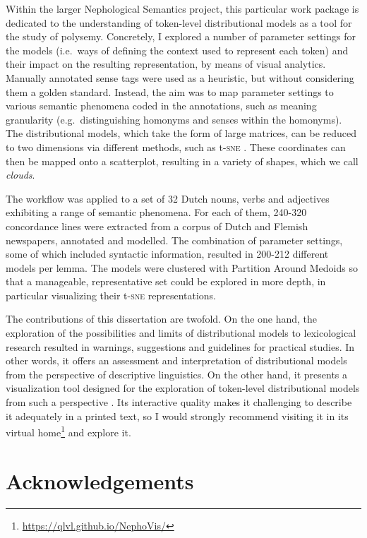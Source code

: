 \documentclass[
]{book}
\begin{document}
Within the larger Nephological Semantics project, this particular work package is dedicated
to the understanding of token-level distributional models as a tool
for the study of polysemy. Concretely, I explored a number of parameter settings for the models
(i.e.~ways of defining the context used to represent each token) and their impact on the
resulting representation, by means of visual analytics.
Manually annotated sense tags were used as a heuristic, but without
considering them a golden standard. Instead, the aim was to map parameter settings to various
semantic phenomena coded in the annotations, such as
meaning granularity (e.g.~distinguishing homonyms and senses within the homonyms).
The distributional models, which take the form of large matrices,
can be reduced to two dimensions via different methods,
such as t-\textsc{sne} \autocite{Rtsne2008,Rtsne2014}.
These coordinates can then be mapped onto a scatterplot, resulting in a variety of
shapes, which we call \emph{clouds}.

The workflow was applied to a set of 32 Dutch nouns, verbs and adjectives exhibiting
a range of semantic phenomena. For each of them, 240-320 concordance lines were extracted
from a corpus of Dutch and Flemish newspapers,
annotated and modelled. The combination of parameter settings, some of which included syntactic
information, resulted in 200-212 different models per lemma. The models were clustered with Partition
Around Medoids \autocite{kaufman.rousseeuw_1990,R-cluster} so that a manageable, representative set could be explored
in more depth, in particular visualizing their t-\textsc{sne} representations.

The contributions of this dissertation are twofold. On the one hand, the exploration of
the possibilities and limits of distributional models to lexicological research resulted in
warnings, suggestions and guidelines for practical studies. In other words, it offers
an assessment and interpretation of distributional models from the perspective of descriptive linguistics.
On the other hand, it presents a visualization tool designed for the exploration of
token-level distributional models from such a perspective \autocite{montes.qlvl_2021a}. Its interactive quality makes
it challenging to describe it adequately in a printed text, so I would strongly
recommend visiting it in its virtual home\footnote{\url{https://qlvl.github.io/NephoVis/}} and explore it.

\hypertarget{acknowledgements}{%
\chapter*{Acknowledgements}\label{acknowledgements}}
\end{document}
